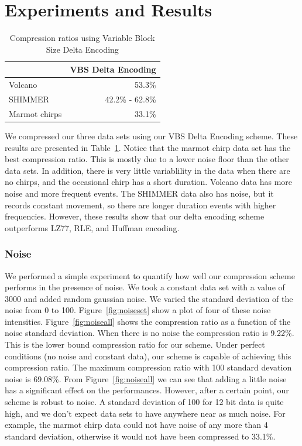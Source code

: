 \section{Experiments and Results}

\begin{table}
  \begin{center}
  \begin{tabular}{|l||r|}
    \hline
    & VBS Delta Encoding \\ \hline
    Volcano & 53.3\% \\ \hline
    SHIMMER & 42.2\% - 62.8\% \\ \hline
    Marmot chirps & 33.1\% \\ \hline
    
  \end{tabular}
  \end{center}
  \caption{Compression ratios using Variable Block Size Delta Encoding}
  \label{table:vbsde}
\end{table}

We compressed our three data sets using our VBS Delta Encoding
scheme. These results are presented in Table~\ref{table:vbsde}. Notice
that the marmot chirp data set has the best compression ratio. This is
mostly due to a lower noise floor than the other data sets. In
addition, there is very little variablility in the data when there are
no chirps, and the occasional chirp has a short duration. Volcano data
has more noise and more frequent events. The SHIMMER data also has
noise, but it records constant movement, so there are longer duration
events with higher frequencies. However, these results show that our
delta encoding scheme outperforms LZ77, RLE, and Huffman encoding.

\subsubsection{Noise}

We performed a simple experiment to quantify how well our compression
scheme performs in the presence of noise. We took a constant data set
with a value of 3000 and added random gaussian noise. We varied the
standard deviation of the noise from 0 to
100. Figure~\ref{fig:noiseset} show a plot of four of these noise
intensities. Figure~\ref{fig:noiseall} shows the compression ratio as
a function of the noise standard deviation. When there is no noise the
compression ratio is 9.22\%. This is the lower bound compression ratio
for our scheme. Under perfect conditions (no noise and constant data),
our scheme is capable of achieving this compression ratio. The maximum
compression ratio with 100 standard devation noise is 69.08\%. From
Figure~\ref{fig:noiseall} we can see that adding a little noise has a
significant effect on the performances. However, after a certain
point, our scheme is robust to noise. A standard deviation of 100 for
12 bit data is quite high, and we don't expect data sets to have
anywhere near as much noise. For example, the marmot chirp data could
not have noise of any more than 4 standard deviation, otherwise it
would not have been compressed to 33.1\%.

